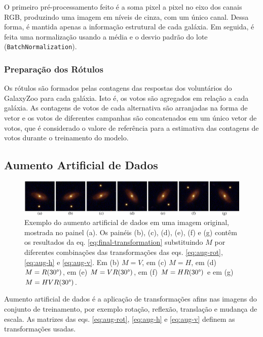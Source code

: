 O primeiro pré-processamento feito é a soma pixel a pixel no eixo dos canais RGB, produzindo uma imagem em níveis de cinza, com um único canal. Dessa forma, é mantida apenas a informação estrutural de cada galáxia. Em seguida, é feita uma normalização usando a média e o desvio padrão do lote (\texttt{BatchNormalization}).


\subsubsection{Preparação dos Rótulos}
\label{sec:modelo-prep-labels}
Os rótulos são formados pelas contagens das respostas dos voluntários do GalaxyZoo para cada galáxia. Isto é, os votos são agregados em relação a cada galáxia. As contagens de votos de cada alternativa são arranjadas na forma de vetor e os votos de diferentes campanhas são concatenados em um único vetor de votos, que é considerado o valore de referência para a estimativa das contagens de votos durante o treinamento do modelo.





\subsection{Aumento Artificial de Dados}
\label{sec:modelo-dataaug}

\begin{figure}[!ht]
  \centering
  \includegraphics[width=\linewidth]{figures/dataaug.pdf}
  \caption{Exemplo do aumento artificial de dados em uma imagem original, mostrada no painel (a). Os painéis (b), (c), (d), (e), (f) e (g) contêm os resultados da eq. \eqref{eq:final-transformation} substituindo $M$ por diferentes combinações das transformações das eqs. \eqref{eq:aug-rot}, \eqref{eq:aug-h} e \eqref{eq:aug-v}. Em (b) $M = V$, em (c) $M = H$, em (d) $M = R(30\degree)$, em (e) $M = V R(30\degree)$, em (f) $M = H R(30\degree)$ e em (g) $M = H V R(30\degree)$.}
  \label{fig:dataaug}
\end{figure}

Aumento artificial de dados \citep{Larry1996} é a aplicação de transformações afins nas imagens do conjunto de treinamento, por exemplo rotação, reflexão, translação e mudança de escala. As matrizes das eqs. \eqref{eq:aug-rot}, \eqref{eq:aug-h} e \eqref{eq:aug-v} definem as transformações usadas.



